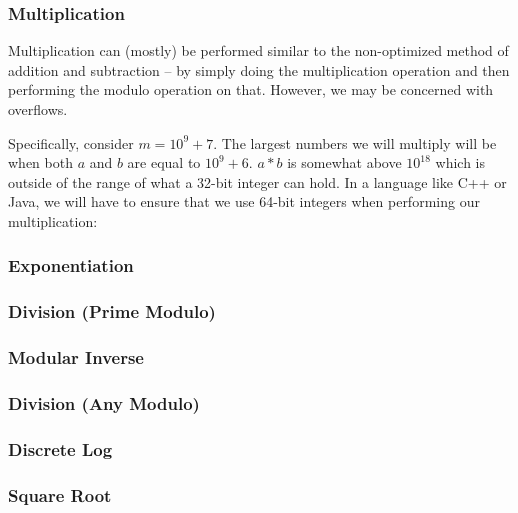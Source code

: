
\subsubsection{Multiplication}

Multiplication can (mostly) be performed similar to the non-optimized method of addition and subtraction -- by simply doing the multiplication operation and then performing the modulo operation on that. However, we may be concerned with overflows.

Specifically, consider $m = 10^9 + 7$. The largest numbers we will multiply will be when both $a$ and $b$ are equal to $10^9 + 6$. $a * b$ is somewhat above $10^{18}$ which is outside of the range of what a 32-bit integer can hold. In a language like C++ or Java, we will have to ensure that we use 64-bit integers when performing our multiplication:


\subsubsection{Exponentiation}

\subsubsection{Division (Prime Modulo)}

\subsubsection{Modular Inverse}

\subsubsection{Division (Any Modulo)}

\subsubsection{Discrete Log}

\subsubsection{Square Root}
